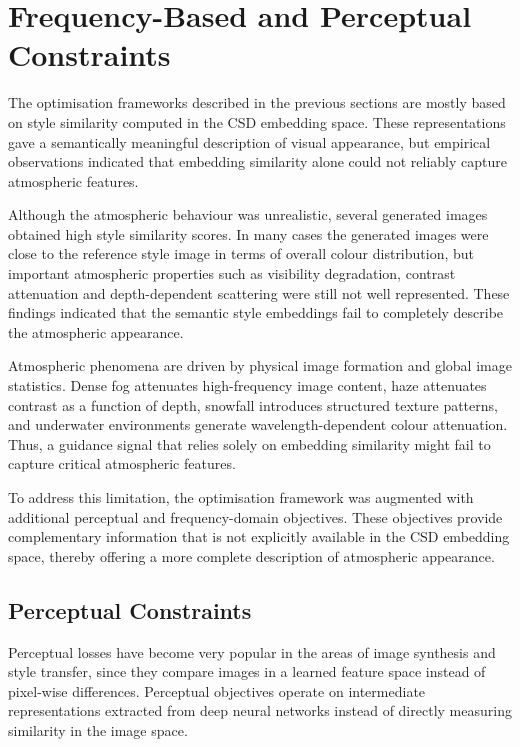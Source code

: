 \FloatBarrier
\section{Frequency-Based and Perceptual Constraints}
\label{sec:ch7_frequency}

The optimisation frameworks described in the previous sections are mostly based on style similarity computed in the CSD embedding space. These representations gave a semantically meaningful description of visual appearance, but empirical observations indicated that embedding similarity alone could not reliably capture atmospheric features.

Although the atmospheric behaviour was unrealistic, several generated images obtained high style similarity scores. In many cases the generated images were close to the reference style image in terms of overall colour distribution, but important atmospheric properties such as visibility degradation, contrast attenuation and depth-dependent scattering were still not well represented. These findings indicated that the semantic style embeddings fail to completely describe the atmospheric appearance.

Atmospheric phenomena are driven by physical image formation and global image statistics. Dense fog attenuates high-frequency image content, haze attenuates contrast as a function of depth, snowfall introduces structured texture patterns, and underwater environments generate wavelength-dependent colour attenuation. Thus, a guidance signal that relies solely on embedding similarity might fail to capture critical atmospheric features.

To address this limitation, the optimisation framework was augmented with additional perceptual and frequency-domain objectives. These objectives provide complementary information that is not explicitly available in the CSD embedding space, thereby offering a more complete description of atmospheric appearance.

\subsection{Perceptual Constraints}
\label{sec:ch7_perceptual}

Perceptual losses have become very popular in the areas of image synthesis and style transfer, since they compare images in a learned feature space instead of pixel-wise differences. Perceptual objectives operate on intermediate representations extracted from deep neural networks instead of directly measuring similarity in the image space.

